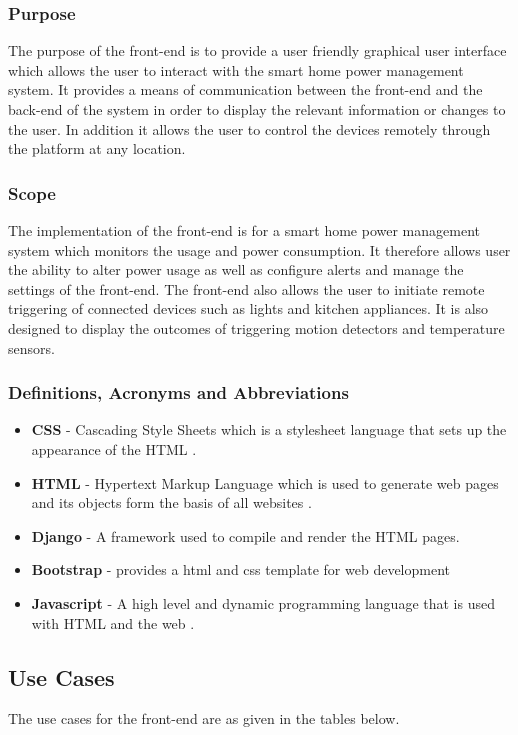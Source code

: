 \documentclass[10pt,twocolumn]{witseiepaper}
\begin{document}
	\subsubsection{Purpose}
	The purpose of the front-end is to provide a user friendly graphical user interface which allows the user to interact with the smart home power management system. It provides a means of communication between the front-end and the back-end of the system in order to display the relevant information or changes to the user. In addition it allows the user to control the devices remotely through the platform at any location.
	
	\subsubsection{Scope}
	The implementation of the front-end is for a smart home power management system which monitors the usage and power consumption. It therefore allows user the ability to alter power usage as well as configure alerts and manage the settings of the front-end. The front-end also allows the user to initiate remote triggering of connected devices such as lights and kitchen appliances. It is also designed to display the outcomes of triggering motion detectors and temperature sensors.
	
	\subsubsection{Definitions, Acronyms and Abbreviations}
	
	\begin{itemize}
		\item \textbf{CSS} - Cascading Style Sheets which is a stylesheet language that sets up the appearance of the HTML \cite{CSS}.
		\item \textbf{HTML} - Hypertext Markup Language which is used to generate web pages and its objects form the basis of all websites \cite{HTML}.
		\item \textbf{Django} - A framework used to compile and render the HTML pages.
		\item \textbf{Bootstrap} - provides a html and css template for web development
		\item \textbf{Javascript} - A high level and dynamic programming language that is used with HTML and the web \cite{Javascript}.
	\end{itemize}
	\newpage
	\subsection{Use Cases}
	The use cases for the front-end are as given in the tables below. 
	
\end{document}
